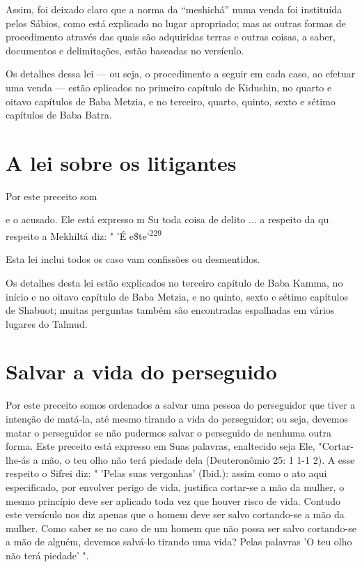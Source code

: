 Assim, foi deixado claro que a norma da ``meshichá'' numa venda foi
instituída pelos Sábios, como está explicado no lugar apropriado; mas as
outras formas de procedimento através das quais são adquiridas terras e
outras coisas, a saber, documentos e delimitações, estão baseadas no
versículo.

Os detalhes dessa lei --- ou seja, o procedimento a seguir em cada caso,
ao efetuar uma venda --- estão eplicados no primeiro capítulo de
Kidus­hin, no quarto e oitavo capítulos de Baba Metzia, e no terceiro,
quarto, quinto, sexto e sétimo capítulos de Baba Batra.

\section{A lei sobre os litigantes}

Por este preceito som

e o acusado. Ele está expresso m Su toda coisa de delito ... a respeito
da qu respeito a Mekhiltá diz: " 'É e\$te'\textsuperscript{229}

Esta lei inclui todos os caso vam confissões ou desmentidos.

Os detalhes desta lei estão explicados no terceiro capítulo de Baba
Kamma, no início e no oitavo capítulo de Baba Metzia, e no quinto, sexto
e sétimo capítulos de Shabuot; muitas perguntas também são encontradas
espa­lhadas em vários lugares do Talmud.

\section{Salvar a vida do perseguido}

Por este preceito somos ordenados a salvar uma pessoa do persegui­dor
que tiver a intenção de matá-la, até mesmo tirando a vida do
perseguidor; ou seja, devemos matar o perseguidor se não pudermos salvar
o perseguido de nenhuma outra forma. Este preceito está expresso em Suas
palavras, enalte­cido seja Ele, "Cortar-lhe-ás a mão, o teu olho não
terá piedade dela (Deutero­nômio 25: 1 1-1 2). A esse respeito o Sifrei
diz: " 'Pelas suas vergonhas' (Ibid.): assim como o ato aqui
especificado, por envolver perigo de vida, justifica cortar-se a mão da
mulher, o mesmo princípio deve ser aplicado toda vez que houver risco de
vida. Contudo este versículo nos diz apenas que o homem deve ser salvo
cortando-se a mão da mulher. Como saber se no caso de um homem que não
possa ser salvo cortando-se a mão de alguém, devemos salvá-lo tirando
uma vida? Pelas palavras 'O teu olho não terá piedade' ".

